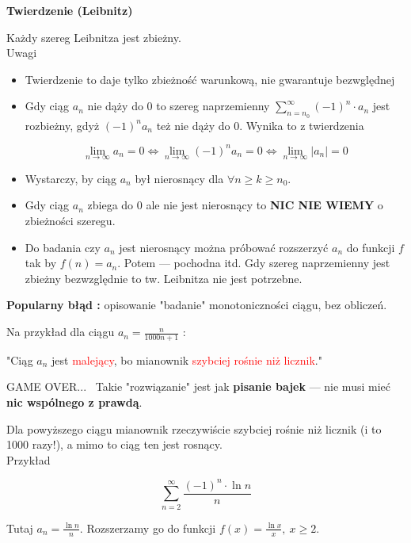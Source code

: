 \textbf{Twierdzenie (Leibnitz)}

Każdy szereg Leibnitza jest zbieżny. \\

Uwagi

\begin{itemize}
    \item Twierdzenie to daje tylko zbieżność warunkową, nie gwarantuje bezwględnej
    \item Gdy ciąg $a_n$ nie dąży do 0 to szereg naprzemienny $ \sum\limits_{n = n_0}^{\infty} (-1)^n \cdot a_n $ jest
    rozbieżny, gdyż $(-1)^n a_n$ też nie dąży do 0. Wynika to z twierdzenia

    $$ \lim_{n \to \infty} a_n = 0 \Leftrightarrow \lim_{n \to \infty} (-1)^n a_n = 0 \Leftrightarrow \lim_{n \to \infty} |a_n| = 0$$

    \item Wystarczy, by ciąg $a_n$ był nierosnący dla $ \forall n \geq k \geq n_0$.
    \item Gdy ciąg $a_n$ zbiega do 0 ale nie jest nierosnący to \textbf{NIC NIE WIEMY} o zbieżności szeregu.
    \item Do badania czy $a_n$ jest nierosnący można próbować rozszerzyć $a_n$ do funkcji $f$ tak by $f(n) = a_n$.
    Potem --- pochodna itd.
    Gdy szereg naprzemienny jest zbieżny bezwzględnie to tw. Leibnitza nie jest potrzebne. \\
\end{itemize}

\textbf{Popularny błąd : } opisowanie "badanie" monotoniczności ciągu, bez obliczeń.

Na przykład dla ciągu $ a_n = \frac{n}{1000n + 1} $ :

"Ciąg $a_n$ jest \textcolor{red}{malejący}, bo mianownik \textcolor{red}{szybciej rośnie niż licznik}."

GAME OVER... \ Takie "rozwiązanie" jest jak \textbf{pisanie bajek} --- nie musi mieć \linebreak
\textbf{nic wspólnego z prawdą}.

Dla powyższego ciągu mianownik rzeczywiście szybciej rośnie niż licznik (i to 1000 razy!), a mimo to ciąg ten jest rosnący. \\

Przykład

$$ \sum\limits_{n=2}^{\infty} \frac{(-1)^n \cdot \ln n}{n} $$

Tutaj $ a_n = \frac{\ln n}{n} $. Rozszerzamy go do funkcji $ f(x) = \frac{\ln x}{x}, \ x \geq 2 $.

